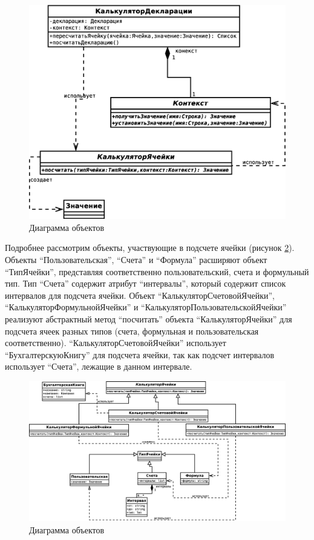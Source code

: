 \documentclass[14pt,a4paper]{reportmod}
\begin{document}
\begin{figure}
  \centering
  \includegraphics[scale=0.4]{uml/_classes_3}
  \caption{Диаграмма объектов}
  \label{pic:classes_3}
\end{figure}

Подробнее рассмотрим объекты, участвующие в подсчете ячейки (рисунок \ref{pic:classes_2}). Объекты ``Пользовательская'', ``Счета'' и ``Формула'' расширяют объект ``ТипЯчейки'', представляя соответственно пользовательский, счета и формульный тип. Тип ``Счета'' содержит атрибут ``интервалы'', который содержит список интервалов для подсчета ячейки. Объект ``КалькуляторСчетовойЯчейки'', ``КалькуляторФормульнойЯчейки'' и ``КалькуляторПользовательскойЯчейки'' реализуют абстрактный метод ``посчитать'' объекта ``КалькуляторЯчейки'' для подсчета ячеек разных типов (счета, формульная и пользовательская соответственно). ``КалькуляторСчетовойЯчейки'' использует ``БухгалтерскуюКнигу'' для подсчета ячейки, так как подсчет интервалов использует ``Счета'', лежащие в данном интервале.

\begin{figure}
  \centering
  \includegraphics[scale=0.4]{uml/_classes_2}
  \caption{Диаграмма объектов}
  \label{pic:classes_2}
\end{figure}
\end{document}
